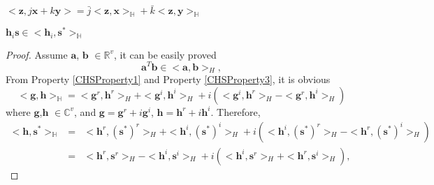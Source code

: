 \documentclass[12pt, draftclsnofoot, onecolumn]{IEEEtran}
\begin{document}
\begin{spacing}{2}
\begin{Property}
$<\mathbf{z}, j\mathbf{x}+k\mathbf{y}>=\bar{j}<\mathbf{z},\mathbf{x}>_{\mathbb{H}}+\bar{k}<\mathbf{z}, \mathbf{y}>_{\mathbb{H}}$
\label{CHSProperty3}
\end{Property}

\begin{Lemma}
$\mathbf{h}_{i}\mathbf{s}\in <\mathbf{h}_{i},\mathbf{s}^{*}>_{\mathbb{H}}$
\end{Lemma}    

\begin{proof}
Assume $\mathbf{a}$, $\mathbf{b}$ $\in \mathbb{R}^{v}$, it can be easily proved  
\begin{equation}
\mathbf{a}^{T}\mathbf{b} \in <\mathbf{a}, \mathbf{b}>_{H},
\label{CHSequation1}
\end{equation}
 From Property \ref{CHSProperty1} and Property \ref{CHSProperty3}, it is obvious 
\begin{equation}
<\mathbf{g},\mathbf{h}>_{\mathbb{H}}=<\mathbf{g}^{r},\mathbf{h}^{r}>_{H}+<\mathbf{g}^{i},\mathbf{h}^{i}>_{H}+i(<\mathbf{g}^{i},\mathbf{h}^{r}>_{H}-<\mathbf{g}^{r},\mathbf{h}^{i}>_{H})
\label{CHSProperty4}
\end{equation}
where $\mathbf{g}$,$\mathbf{h}$ $\in \mathbb{C}^{v}$, and $\mathbf{g}=\mathbf{g}^{r}+i\mathbf{g}^{i}$, $\mathbf{h}=\mathbf{h}^{r}+i\mathbf{h}^{i}$. Therefore, 
\begin{eqnarray}
\nonumber
<\mathbf{h}, \mathbf{s}^{*}>_{\mathbb{H}}&=&<\mathbf{h}^{r},  (\mathbf{s}^{*})^{r}>_{H}+<\mathbf{h}^{i},  (\mathbf{s}^{*})^{i}>_{H}+i(<\mathbf{h}^{i},  (\mathbf{s}^{*})^{r}>_{H}-<\mathbf{h}^{r},  (\mathbf{s}^{*})^{i}>_{H})\\
&=&<\mathbf{h}^{r}, \mathbf{s}^{r}>_{H}-<\mathbf{h}^{i}, \mathbf{s}^{i}>_{H}+i(<\mathbf{h}^{i}, \mathbf{s}^{r}>_{H}+<\mathbf{h}^{r}, \mathbf{s}^{i}>_{H}),
\label{CHSequation2}
\end{eqnarray}


\end{proof}
\end{spacing}
\end{document}
